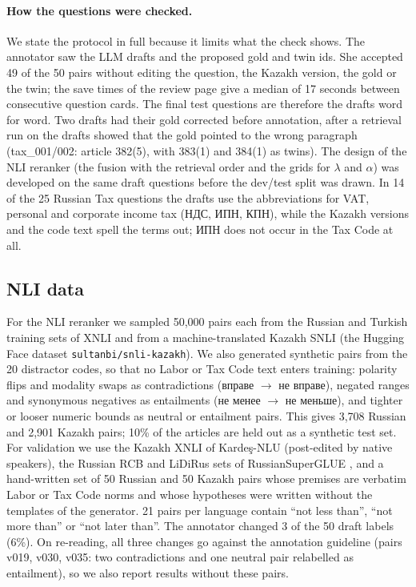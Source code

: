 \documentclass[11pt]{article}
\newcommand{\ru}[1]{#1}
\begin{document}
\paragraph{How the questions were checked.} We state the protocol in full because it limits what the
check shows. The annotator saw the LLM drafts and the proposed gold and twin ids. She accepted 49 of the 50
pairs without editing the question, the Kazakh version, the gold or the twin; the save times of the review
page give a median of 17 seconds between consecutive question cards. The final test questions are therefore
the drafts word for word. Two drafts had their gold corrected before annotation, after a retrieval run on the
drafts showed that the gold pointed to the wrong paragraph (tax\_001/002: article 382(5), with 383(1) and
384(1) as twins). The design of the NLI reranker (the fusion with the retrieval order and the grids for
$\lambda$ and $\alpha$) was developed on the same draft questions before the dev/test split was drawn. In 14
of the 25 Russian Tax questions the drafts use the abbreviations for VAT, personal and corporate income tax
(\ru{НДС, ИПН, КПН}), while the Kazakh versions and the code text spell the terms out; \ru{ИПН} does not occur in
the Tax Code at all.

\subsection{NLI data}
For the NLI reranker we sampled 50,000 pairs each from the Russian and Turkish training sets of XNLI
\citep{conneau-etal-2018-xnli} and from a machine-translated Kazakh SNLI \citep{bowman-etal-2015-large}
(the Hugging Face dataset \texttt{sultanbi/snli-kazakh}). We also generated synthetic pairs from the 20 distractor codes, so
that no Labor or Tax Code text enters training: polarity flips and modality swaps as contradictions
(\ru{вправе} $\rightarrow$ \ru{не вправе}), negated ranges and synonymous negatives as entailments
(\ru{не менее} $\rightarrow$ \ru{не меньше}), and tighter or looser numeric bounds as neutral or entailment
pairs. This gives 3,708 Russian and 2,901 Kazakh pairs; 10\% of the articles are held out as a synthetic test
set. For validation we use the Kazakh XNLI of Karde\c{s}-NLU \citep{senel-etal-2024-kardes} (post-edited by native
speakers), the Russian RCB and LiDiRus sets of RussianSuperGLUE \citep{shavrina-etal-2020-russiansuperglue}, and a hand-written set of 50 Russian and 50 Kazakh pairs whose premises are verbatim
Labor or Tax Code norms and whose hypotheses were written without the templates of the generator. 21 pairs per
language contain ``not less than'', ``not more than'' or ``not later than''. The annotator changed 3 of the 50
draft labels (6\%). On re-reading, all three changes go against the annotation guideline (pairs v019, v030,
v035: two contradictions and one neutral pair relabelled as entailment), so we also report results without
these pairs.
\end{document}
